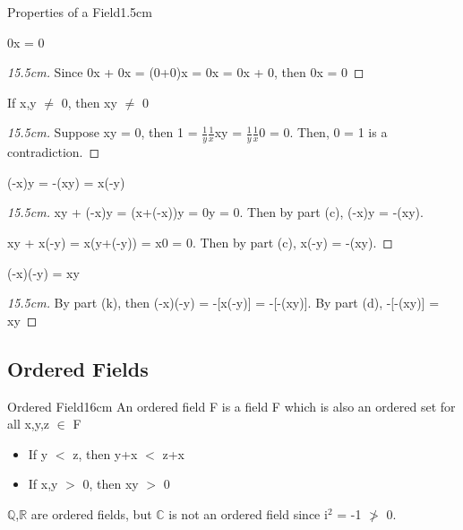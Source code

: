 \begin{ltheorem}{Properties of a Field}{1.5cm}
			\newpage
	
		\item 0x = 0
		
			\begin{proof}[15.5cm]
				Since 0x + 0x = (0+0)x = 0x = 0x + 0, then 0x = 0
			\end{proof}
	
		\item If x,y $\not =$ 0, then xy $\not =$ 0

			\begin{proof}[15.5cm]
				Suppose xy = 0, then 1 = $\frac{1}{y}\frac{1}{x}$xy
				= $\frac{1}{y}$$\frac{1}{x}$0 = 0.
				Then, 0 = 1 is a contradiction.
			\end{proof}
				
		\item (-x)y = -(xy) = x(-y)
		
			\begin{proof}[15.5cm]
				xy + (-x)y = (x+(-x))y = 0y = 0.
				Then by part (c), (-x)y = -(xy).

				xy + x(-y) = x(y+(-y)) = x0 = 0.
				Then by part (c), x(-y) = -(xy).
			\end{proof}

		\item (-x)(-y) = xy
		
			\begin{proof}[15.5cm]
				By part (k), then (-x)(-y) = -[x(-y)] = -[-(xy)].
				By part (d), -[-(xy)] = xy
			\end{proof}
	\end{ltheorem}

	\vspace{0.5cm}





\subsection{ Ordered Fields }

	\begin{definition}{Ordered Field}{16cm}
		An {\color{lblue} ordered field} F is a field F which is also an ordered set
		for all x,y,z $\in$ F

		\begin{itemize}[leftmargin=1cm, itemsep=0.1cm]
			\item If y $<$ z, then y+x $<$ z+x
		
			\item If x,y $>$ 0, then xy $>$ 0
		\end{itemize}
		
		$ \mathbb{Q} $,$ \mathbb{R} $ are ordered fields,
		but $ \mathbb{C} $ is not an ordered field since i$^2$ = -1 $\not >$ 0.
	\end{definition}
	
